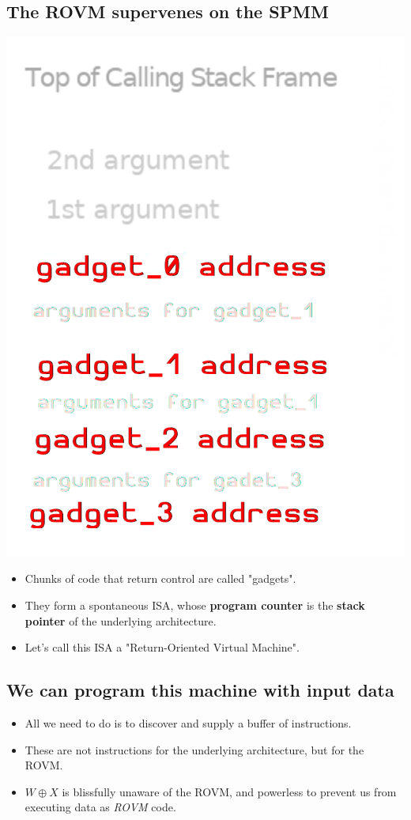 \documentclass[11pt]{article}
\begin{document}
\subsection*{The ROVM supervenes on the SPMM}
\label{sec:org2c68d29}
\begin{center}
\includegraphics[width=.9\linewidth]{./img/stack_frame_rop.png}
\end{center}
\begin{itemize}
\item Chunks of code that return control are called "gadgets".
\item They form a spontaneous ISA, whose \textbf{program counter} is the \textbf{stack pointer} of the underlying architecture.
\item Let's call this ISA a "Return-Oriented Virtual Machine".
\end{itemize}

\subsection*{We can program this machine with input data}
\label{sec:orgfdea52d}
\begin{itemize}
\item All we need to do is to discover and supply a buffer of instructions.
\item These are not instructions for the underlying architecture, but for the ROVM.
\item \(W\oplus X\) is blissfully unaware of the ROVM, and powerless to prevent us from executing data as \emph{ROVM} code.
\end{itemize}
\end{document}
